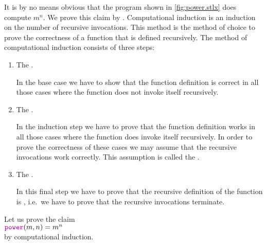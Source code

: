 It is by no means obvious that the program shown in \ref{fig:power.stlx} does compute
$m^n$.  We prove this claim by  .
Computational induction is an induction on the number of recursive invocations.
This method is the method of choice to prove the correctness of a function that is defined recursively.
The method of computational induction consists of three steps:
\begin{enumerate}
\item The .

      In the base case we have to show that the function definition is correct in all those cases where the function
      does not invoke itself recursively.
\item The .

      In the induction step we have to prove that the function definition works in all those cases where
      the function does invoke itself recursively.  In order to prove the correctness of these cases we may
      assume that the recursive invocations work correctly.  This assumption is called the
      .
\item The .

      In this final step we have to prove that the recursive definition of the function is ,
      i.e.~we have to prove that the recursive invocations terminate.
\end{enumerate}
Let us prove the claim 
\\[0.2cm]
\hspace*{1.3cm}
 $\mytt{power}(m,n) = m^n$
\\[0.2cm] 
by computational induction.
